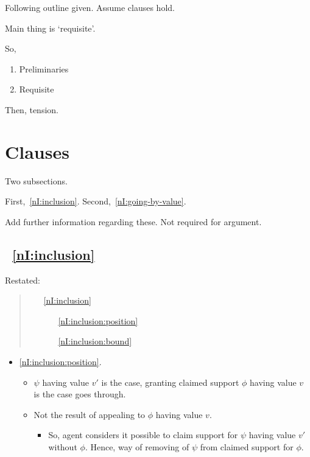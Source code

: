 \begin{note}
  Following outline given.
  Assume clauses hold.

  Main thing is `requisite'.

  So,
  \begin{enumerate}
  \item Preliminaries
  \item Requisite
  \end{enumerate}
  Then, tension.
\end{note}

\section{Clauses}
\label{sec:nI:arg:clauses}

\begin{note}
  Two subsections.

  First,~\ref{nI:inclusion}.
  Second,~\ref{nI:going-by-value}.

  Add further information regarding these.
  Not required for argument.
\end{note}

\subsection{~\ref{nI:inclusion}}

\begin{note}[\ref{nI:inclusion}]
  Restated:
  \begin{quote}
    \begin{enumerate}
    \item[\ref{nI:inclusion}]
      \nIClauseInclusion{}
      \begin{enumerate}
      \item[\ref{nI:inclusion:position}] \nIClauseInclusionPosition{}
      \item[\ref{nI:inclusion:bound}] \nIClauseInclusioBound{}
      \end{enumerate}
    \end{enumerate}
  \end{quote}
\end{note}

\begin{note}
  \begin{itemize}
  \item \ref{nI:inclusion:position}.
    \begin{itemize}
    \item \(\psi\) having value \(v'\) is the case, granting claimed support \(\phi\) having value \(v\) is the case goes through.
    \item Not the result of appealing to \(\phi\) having value \(v\).
      \begin{itemize}
      \item So, agent considers it possible to claim support for \(\psi\) having value \(v'\) without \(\phi\).
        Hence, way of removing \requ{} of \(\psi\) from claimed support for \(\phi\).
      \end{itemize}
    \end{itemize}
  \end{itemize}
\end{note}

